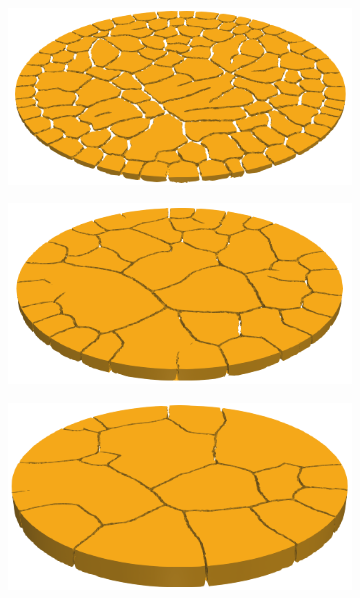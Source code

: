 \begin{figure}[!htb]
  \begin{subfigure}{0.23\textwidth}
    \includegraphics[width=\textwidth,scale=0.5]{Chapter4/figures/3D/4mm_3D.png}
    \caption{}
  \end{subfigure}
  \hspace{0.05\textwidth}
  \begin{subfigure}{0.23\textwidth}
    \includegraphics[width=\textwidth,scale=0.5]{Chapter4/figures/3D/8mm_3D.png}
    \caption{}
  \end{subfigure}
  \hspace{0.05\textwidth}
  \begin{subfigure}{0.23\textwidth}
    \includegraphics[width=\textwidth,scale=0.5]{Chapter4/figures/3D/16mm_3D.png}

\end{subfigure}
\end{figure}
